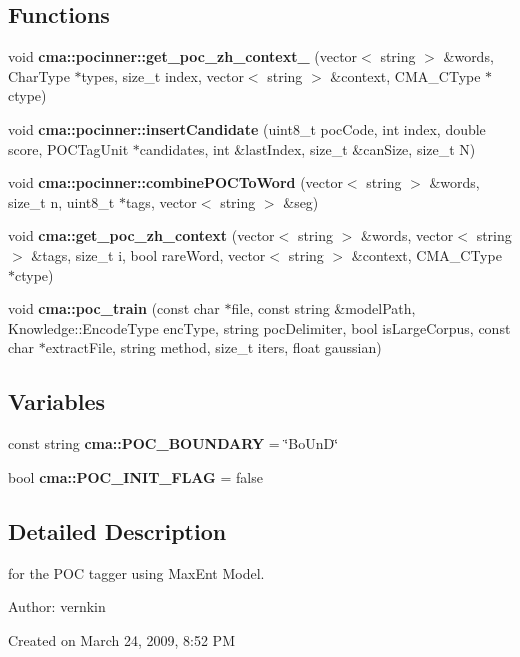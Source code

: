 \subsection*{Functions}
\begin{CompactItemize}
\item 
void {\bf cma::pocinner::get\_\-poc\_\-zh\_\-context\_} (vector$<$ string $>$ \&words, CharType $\ast$types, size\_\-t index, vector$<$ string $>$ \&context, CMA\_\-CType $\ast$ctype)
\item 
void {\bf cma::pocinner::insertCandidate} (uint8\_\-t pocCode, int index, double score, POCTagUnit $\ast$candidates, int \&lastIndex, size\_\-t \&canSize, size\_\-t N)
\item 
void {\bf cma::pocinner::combinePOCToWord} (vector$<$ string $>$ \&words, size\_\-t n, uint8\_\-t $\ast$tags, vector$<$ string $>$ \&seg)
\item 
void {\bf cma::get\_\-poc\_\-zh\_\-context} (vector$<$ string $>$ \&words, vector$<$ string $>$ \&tags, size\_\-t i, bool rareWord, vector$<$ string $>$ \&context, CMA\_\-CType $\ast$ctype)
\item 
void {\bf cma::poc\_\-train} (const char $\ast$file, const string \&modelPath, Knowledge::EncodeType encType, string pocDelimiter, bool isLargeCorpus, const char $\ast$extractFile, string method, size\_\-t iters, float gaussian)
\end{CompactItemize}
\subsection*{Variables}
\begin{CompactItemize}
\item 
const string \textbf{cma::POC\_\-BOUNDARY} = \char`\"{}BoUnD\char`\"{}\label{namespacecma_6a315ae82b1eb14e31c1c281af3b041c}

\item 
bool \textbf{cma::POC\_\-INIT\_\-FLAG} = false\label{namespacecma_835f0d6dd48a8037cf3d4a5a415a7323}

\end{CompactItemize}


\subsection{Detailed Description}
for the POC tagger using MaxEnt Model. 

\begin{Desc}
\item[Author:]vernkin\end{Desc}
Created on March 24, 2009, 8:52 PM 

